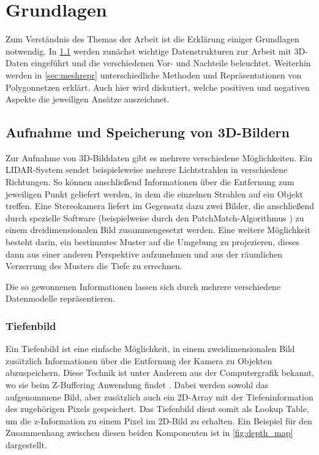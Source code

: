 
\chapter{Grundlagen}
\label{ch:grundlagen}

Zum Verständnis des Themas der Arbeit ist die Erklärung einiger Grundlagen notwendig.
In \ref{sec:3d-bilder} werden zunächst wichtige Datenstrukturen zur Arbeit mit 3D-Daten eingeführt und die verschiedenen Vor- und Nachteile beleuchtet.
Weiterhin werden in \ref{sec:meshrepr} unterschiedliche Methoden und Repräsentationen von Polygonnetzen erklärt.
Auch hier wird diskutiert, welche positiven und negativen Aspekte die jeweiligen Ansätze auszeichnet.


\section{Aufnahme und Speicherung von 3D-Bildern}
\label{sec:3d-bilder}

Zur Aufnahme von 3D-Bilddaten gibt es mehrere verschiedene Möglichkeiten.
Ein LIDAR-System sendet beispielsweise mehrere Lichtstrahlen in verschiedene Richtungen.
So können anschließend Informationen über die Entfernung zum jeweiligen Punkt geliefert werden, in dem die einzelnen Strahlen auf ein Objekt treffen.
Eine Stereokamera liefert im Gegensatz dazu zwei Bilder, die anschließend durch spezielle Software (beispielweise durch den PatchMatch-Algorithmus \cite{barnes2009patchmatch}) zu einem dreidimensionalen Bild zusammengesetzt werden.
Eine weitere Möglichkeit besteht darin, ein bestimmtes Muster auf die Umgebung zu projezieren, dieses dann aus einer anderen Perspektive aufzunehmen und aus der räumlichen Verzerrung des Musters die Tiefe zu errechnen.

Die so gewonnenen Informationen lassen sich durch mehrere verschiedene Datenmodelle repräsentieren.


\subsection{Tiefenbild}
\label{subsec:tiefenbild}

Ein Tiefenbild ist eine einfache Möglichkeit, in einem zweidimensionalen Bild zusätzlich Informationen über die Entfernung der Kamera zu Objekten abzuspeichern.
Diese Technik ist unter Anderem aus der Computergrafik bekannt, wo sie beim Z-Buffering Anwendung findet \cite[32]{catmull1974subdivision}.
Dabei werden sowohl das aufgenommene Bild, aber zusätzlich auch ein 2D-Array mit der Tiefeninformation des zugehörigen Pixels gespeichert.
Das Tiefenbild dient somit als Lookup Table, um die z-Information zu einem Pixel im 2D-Bild zu erhalten.
Ein Beispiel für den Zusammenhang zwischen diesen beiden Komponenten ist in \autoref{fig:depth_map} dargestellt.

